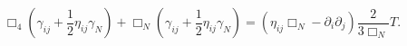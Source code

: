 \begin{equation}\label{Gij}
 \Box_4(\gamma_{ij}+\frac{1}{2} \eta_{ij} \gamma_N)+
\Box_N(\gamma_{ij}+\frac{1}{2}\eta_{ij} \gamma_N)=(\eta_{ij} 
\Box_N - \partial_i \partial_j)\frac{2}{3 \Box_N} T.
\end{equation}

